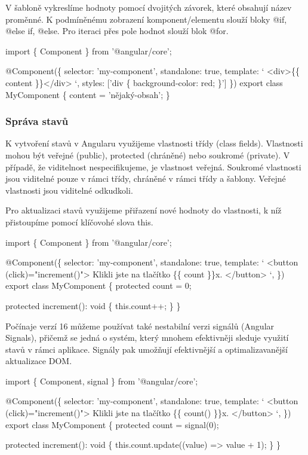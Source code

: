 V šabloně vykreslíme hodnoty pomocí dvojitých závorek, které obsahují název proměnné. K podmíněnému zobrazení komponent/elementu slouží bloky @if, @else if, @else. 
Pro iteraci přes pole hodnot slouží blok @for.\cite{angulardev}

\begin{prog}
import \{ Component \} from '@angular/core';

@Component(\{
  selector: 'my-component',
  standalone: true,
  template: `
    <div>\{\{ content \}\}</div>
  `,
  styles: ['div \{ background-color: red; \}']
\})
export class MyComponent \{
  content = 'nějaký-obsah';
\}
\end{prog}

\subsubsection{Správa stavů}

K vytvoření stavů v Angularu využijeme vlastnosti třídy (class fields). Vlastnosti mohou být veřejné (public), protected (chráněné) nebo soukromé (private). 
V případě, že viditelnost nespecifikujeme, je vlastnost veřejná. Soukromé vlastnosti jsou viditelné pouze v rámci třídy, chráněné v rámci třídy a šablony. 
Veřejné vlastnosti jsou viditelné odkudkoli.\cite{angulardev,learningangular}

Pro aktualizaci stavů využijeme přiřazení nové hodnoty do vlastnosti, k níž přistoupíme pomocí klíčovohé slova this.\cite{angulardev}

\begin{prog}
import \{ Component \} from '@angular/core';

@Component(\{
  selector: 'my-component',
  standalone: true,
  template: `
    <button (click)="increment()">
      Klikli jste na tlačítko \{\{ count \}\}x.
    </button>
  `,
\})
export class MyComponent \{
  protected count = 0;

  protected increment(): void \{
    this.count++;
  \}
\}
\end{prog}

Počínaje verzí 16 můžeme používat také nestabilní verzi signálů (Angular Signals), přičemž se jedná o systém, který mnohem efektivněji sleduje využití stavů v rámci aplikace. 
Signály pak umožňují efektivnější a optimalizavanější aktualizace DOM. 

\begin{prog}
import \{ Component, signal \} from '@angular/core';

@Component(\{
  selector: 'my-component',
  standalone: true,
  template: `
    <button (click)="increment()">
      Klikli jste na tlačítko \{\{ count() \}\}x.
    </button>
  `,
\})
export class MyComponent \{
  protected count = signal(0);

  protected increment(): void \{
    this.count.update((value) => value + 1);
  \}
\}
\end{prog}

